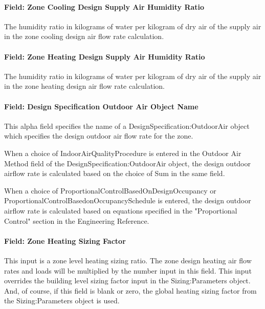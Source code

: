 \paragraph{Field: Zone Cooling Design Supply Air Humidity Ratio}\label{field-zone-cooling-design-supply-air-humidity-ratio}

The humidity ratio in kilograms of water per kilogram of dry air of the supply air in the zone cooling design air flow rate calculation.

\paragraph{Field: Zone Heating Design Supply Air Humidity Ratio}\label{field-zone-heating-design-supply-air-humidity-ratio}

The humidity ratio in kilograms of water per kilogram of dry air of the supply air in the zone heating design air flow rate calculation.

\paragraph{Field: Design Specification Outdoor Air Object Name}\label{field-design-specification-outdoor-air-object-name-000}

This alpha field specifies the name of a DesignSpecification:OutdoorAir object which specifies the design outdoor air flow rate for the zone.

When a choice of IndoorAirQualityProcedure is entered in the Outdoor Air Method field of the DesignSpecification:OutdoorAir object, the design outdoor airflow rate is calculated based on the choice of Sum in the same field.

When a choice of ProportionalControlBasedOnDesignOccupancy or ProportionalControlBasedonOccupancySchedule is entered, the design outdoor airflow rate is calculated based on equations specified in the "Proportional Control" section in the Engineering Reference.  

\paragraph{Field: Zone Heating Sizing Factor}\label{field-zone-heating-sizing-factor}

This input is a zone level heating sizing ratio. The zone design heating air flow rates and loads will be multiplied by the number input in this field. This input overrides the building level sizing factor input in the Sizing:Parameters object. And, of course, if this field is blank or zero, the global heating sizing factor from the Sizing:Parameters object is used.

